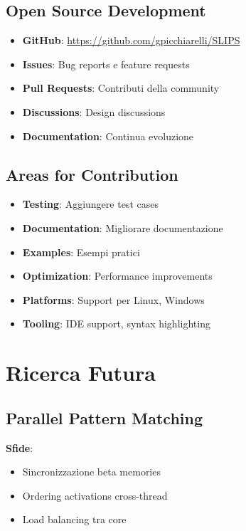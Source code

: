 \subsection{Open Source Development}

\begin{itemize}
\item \textbf{GitHub}: \url{https://github.com/gpicchiarelli/SLIPS}
\item \textbf{Issues}: Bug reports e feature requests
\item \textbf{Pull Requests}: Contributi della community
\item \textbf{Discussions}: Design discussions
\item \textbf{Documentation}: Continua evoluzione
\end{itemize}

\subsection{Areas for Contribution}

\begin{infobox}[Contribute]
\begin{itemize}
\item \textbf{Testing}: Aggiungere test cases
\item \textbf{Documentation}: Migliorare documentazione
\item \textbf{Examples}: Esempi pratici
\item \textbf{Optimization}: Performance improvements
\item \textbf{Platforms}: Support per Linux, Windows
\item \textbf{Tooling}: IDE support, syntax highlighting
\end{itemize}
\end{infobox}

\section{Ricerca Futura}

\subsection{Parallel Pattern Matching}

\textbf{Sfide}:
\begin{itemize}
\item Sincronizzazione beta memories
\item Ordering activations cross-thread
\item Load balancing tra core
\end{itemize}

